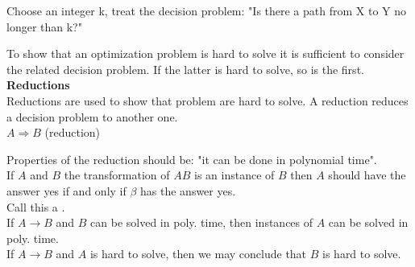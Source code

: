 \begin{example}
  Choose an integer k, treat the decision problem: "Is there a path from X to Y no longer than k?"
\end{example}  

To show that an optimization problem is hard to solve it is sufficient to consider the related decision problem. If the latter is hard to solve, so is the first. \\

\textbf{Reductions} \\
Reductions are used to show that problem are hard to solve. A reduction reduces a decision problem to another one.\\
$A \Rightarrow B$ (reduction)

Properties of the reduction should be: "it can be done in polynomial time". \\
If $A$ and $B$ the transformation of $A B$ is an instance of $B$ then $A$ should have the answer yes if and only if $\beta$ has the answer yes.\\
Call this a .\\
If $A \rightarrow B$ and $B$ can be solved in poly. time, then instances of $A$ can be solved in poly. time. \\
If $A \rightarrow B$ and $A$ is hard to solve, then we may conclude that  $B$ is hard to solve. \\

